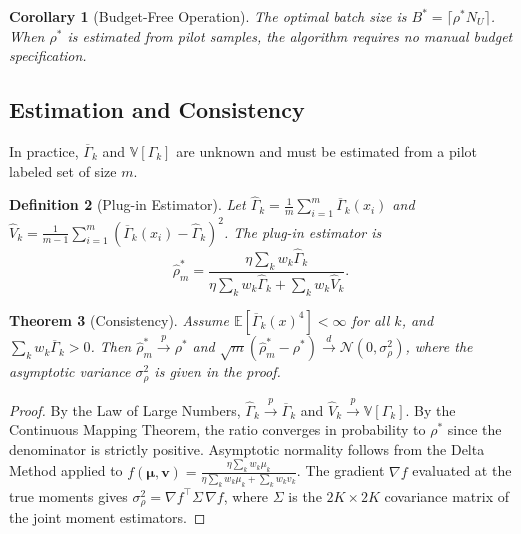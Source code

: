 \documentclass[12pt,a4paper]{article}
\newtheorem{theorem}{Theorem}[section]
\newtheorem{corollary}[theorem]{Corollary}
\newtheorem{definition}[theorem]{Definition}
\newcommand{\E}{\mathbb{E}}
\newcommand{\V}{\mathbb{V}}
\begin{document}
\begin{corollary}[Budget-Free Operation]
\label{cor:budget-free}
The optimal batch size is $B^* = \lceil\rho^* N_U\rceil$.  When $\rho^*$ is
estimated from pilot samples, the algorithm requires no manual budget
specification.
\end{corollary}

\subsection{Estimation and Consistency}

In practice, $\overline{\Gamma}_k$ and $\V[\Gamma_k]$ are unknown and must
be estimated from a pilot labeled set of size $m$.

\begin{definition}[Plug-in Estimator]
\label{def:plugin}
Let $\widehat{\Gamma}_k = \frac{1}{m}\sum_{i=1}^m \overline{\Gamma}_k(x_i)$
and $\widehat{V}_k = \frac{1}{m-1}\sum_{i=1}^m
(\overline{\Gamma}_k(x_i)-\widehat{\Gamma}_k)^2$.  The plug-in estimator is
\begin{equation}\label{eq:plugin}
    \hat{\rho}^*_m =
    \frac{\eta\sum_{k} w_k \widehat{\Gamma}_k}
         {\eta\sum_{k} w_k \widehat{\Gamma}_k
          + \sum_{k} w_k \widehat{V}_k}.
\end{equation}
\end{definition}

\begin{theorem}[Consistency]
\label{thm:consistency}
Assume $\E[\overline{\Gamma}_k(x)^4]<\infty$ for all $k$, and
$\sum_k w_k\overline{\Gamma}_k>0$.  Then
$\hat{\rho}^*_m \xrightarrow{p} \rho^*$ and
$\sqrt{m}(\hat{\rho}^*_m - \rho^*) \xrightarrow{d}
\mathcal{N}(0,\sigma^2_\rho)$,
where the asymptotic variance $\sigma^2_\rho$ is given in the proof.
\end{theorem}

\begin{proof}
By the Law of Large Numbers, $\widehat{\Gamma}_k\xrightarrow{p}\overline{\Gamma}_k$
and $\widehat{V}_k\xrightarrow{p}\V[\Gamma_k]$.  By the Continuous Mapping
Theorem, the ratio converges in probability to $\rho^*$ since the denominator
is strictly positive.  Asymptotic normality follows from the Delta Method
applied to $f(\boldsymbol{\mu},\boldsymbol{v}) =
\frac{\eta\sum_k w_k \mu_k}{\eta\sum_k w_k \mu_k + \sum_k w_k v_k}$.
The gradient $\nabla f$ evaluated at the true moments gives
$\sigma^2_\rho = \nabla f^\top \Sigma \,\nabla f$, where $\Sigma$ is the
$2K\times2K$ covariance matrix of the joint moment estimators.
\end{proof}
\end{document}
